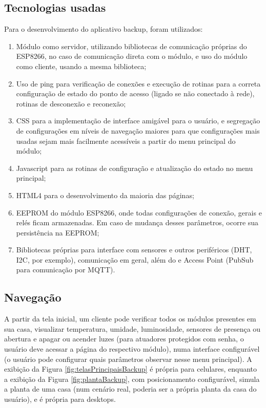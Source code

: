 \subsection{Tecnologias usadas}

Para o desenvolvimento do aplicativo backup, foram utilizados:

\begin{enumerate}
	\item Módulo como servidor, utilizando bibliotecas de comunicação próprias do ESP8266, no caso de comunicação direta com o módulo, e uso do módulo como cliente, usando a mesma biblioteca;
	\item Uso de ping para verificação de conexões e execução de rotinas para a correta configuração de estado do ponto de acesso (ligado se não conectado à rede), rotinas de desconexão e reconexão;
	\item CSS para a implementação de interface amigável para o usuário, e segregação de configurações em níveis de navegação maiores para que configurações mais usadas sejam mais facilmente acessíveis a partir do menu principal do módulo;
	\item Javascript para as rotinas de configuração e atualização do estado no menu principal;
	\item HTML4 para o desenvolvimento da maioria das páginas;
	\item EEPROM do módulo ESP8266, onde todas configurações de conexão, gerais e relés ficam armazenadas. Em caso de mudança desses parâmetros, ocorre sua persistência na EEPROM;
	\item Bibliotecas próprias para interface com sensores e outros periféricos (DHT, I2C, por exemplo), comunicação em geral, além do \wwifi e Access Point (PubSub para comunicação por MQTT).
\end{enumerate}

\subsection{Navegação}

A partir da tela inicial, um cliente pode verificar todos os módulos presentes em sua casa, visualizar temperatura, umidade, luminosidade, sensores de presença ou abertura e apagar ou acender luzes (para atuadores protegidos com senha, o usuário deve acessar a página do respectivo módulo), numa interface configurável (o usuário pode configurar quais parâmetros observar nesse menu principal). A exibição da Figura \ref{fig:telasPrincipaisBackup} é própria para celulares, enquanto a exibição da Figura \ref{fig:plantaBackup}, com posicionamento configurável, simula a planta de uma casa (num cenário real, poderia ser a própria planta da casa do usuário), e é própria para desktops.

